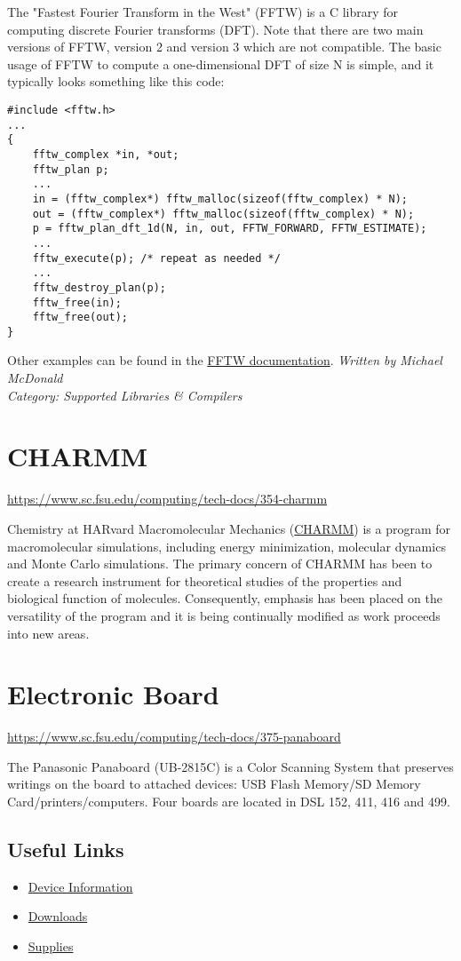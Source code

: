 \documentclass[12pt,a4paper]{article}
\begin{document}
The "Fastest Fourier Transform in the West" (FFTW) is a C library for computing discrete Fourier transforms (DFT). Note that there are two main versions of FFTW, version 2 and version 3 which are not compatible. The basic usage of FFTW to compute a one-dimensional DFT of size N is simple, and it typically looks something like this code:
\begin{verbatim}
#include <fftw.h>
...
{
    fftw_complex *in, *out;
    fftw_plan p;
    ...
    in = (fftw_complex*) fftw_malloc(sizeof(fftw_complex) * N);
    out = (fftw_complex*) fftw_malloc(sizeof(fftw_complex) * N);
    p = fftw_plan_dft_1d(N, in, out, FFTW_FORWARD, FFTW_ESTIMATE);
    ...
    fftw_execute(p); /* repeat as needed */
    ...
    fftw_destroy_plan(p);
    fftw_free(in);
    fftw_free(out);
}
\end{verbatim}
Other examples can be found in the \href{http://www.fftw.org/fftw3_doc/index.html}{FFTW documentation}.
\hfill \textit{Written by Michael McDonald} \\
\hfill \textit{Category: Supported Libraries \& Compilers}

\section{CHARMM}
\url{https://www.sc.fsu.edu/computing/tech-docs/354-charmm}

Chemistry at HARvard Macromolecular Mechanics (\href{http://www.charmm.org/}{CHARMM}) is a program for macromolecular simulations, including energy minimization, molecular dynamics and Monte Carlo simulations. The primary concern of CHARMM has been to create a research instrument for theoretical studies of the properties and biological function of molecules. Consequently, emphasis has been placed on the versatility of the program and it is being continually modified as work proceeds into new areas.

\section{Electronic Board}
\url{https://www.sc.fsu.edu/computing/tech-docs/375-panaboard}

The Panasonic Panaboard (UB-2815C) is a Color Scanning System that preserves writings on the board to attached devices: USB Flash Memory/SD Memory Card/printers/computers. Four boards are located in DSL 152, 411, 416 and 499.

\subsection*{Useful Links}
\begin{itemize}
    \item \href{https://panasonic.net/cns/doc/pcc/support/panaboard/ub-2815c/index.html}{Device Information}
    \item \href{https://panasonic.net/cns/doc/pcc/support/panaboard/ub-2815c/index.html#download}{Downloads}
    \item \href{https://panasonic.net/cns/doc/pcc/support/panaboard/ub-2815c/index.html#supply}{Supplies}
\end{itemize}
\end{document}

